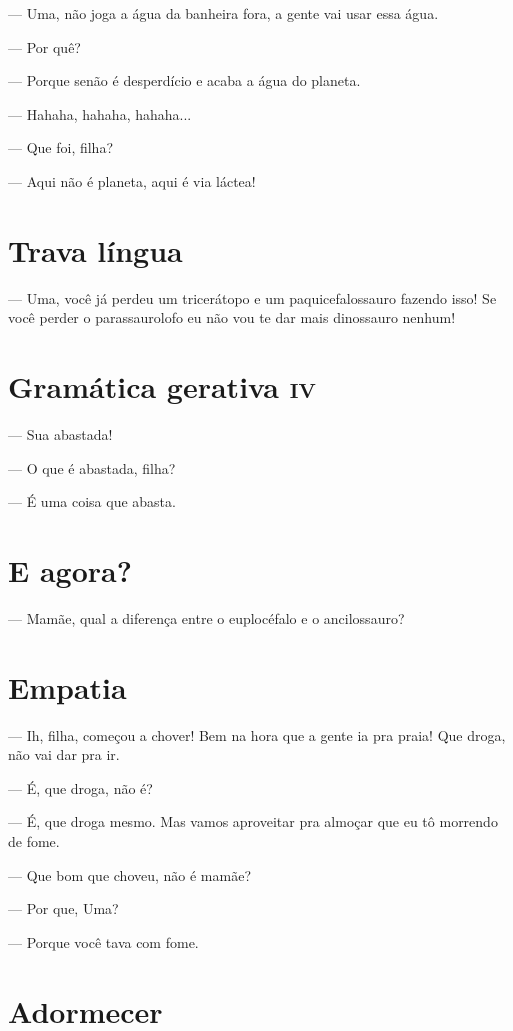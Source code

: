 {— Uma, não joga a água da banheira fora, a gente vai usar essa água.

— Por quê?

— Porque senão é desperdício e acaba a água do planeta.

— Hahaha, hahaha, hahaha...

— Que foi, filha?

— Aqui não é planeta, aqui é via láctea!

\chapter{Trava língua}

— Uma, você já perdeu um tricerátopo e um paquicefalossauro fazendo
isso! Se você perder o parassaurolofo eu não vou te dar mais dinossauro
nenhum!

\chapter{Gramática gerativa \textsc{iv}}

— Sua abastada!

— O que é abastada, filha?

— É uma coisa que abasta.

\chapter{E agora?}

— Mamãe, qual a diferença entre o euplocéfalo e o ancilossauro?

\chapter{Empatia}

— Ih, filha, começou a chover! Bem na hora que a gente ia pra praia! Que
droga, não vai dar pra ir.

— É, que droga, não é?

— É, que droga mesmo. Mas vamos aproveitar pra almoçar que eu tô
morrendo de fome.

— Que bom que choveu, não é mamãe?

— Por que, Uma?

— Porque você tava com fome.

\chapter{Adormecer}

}
